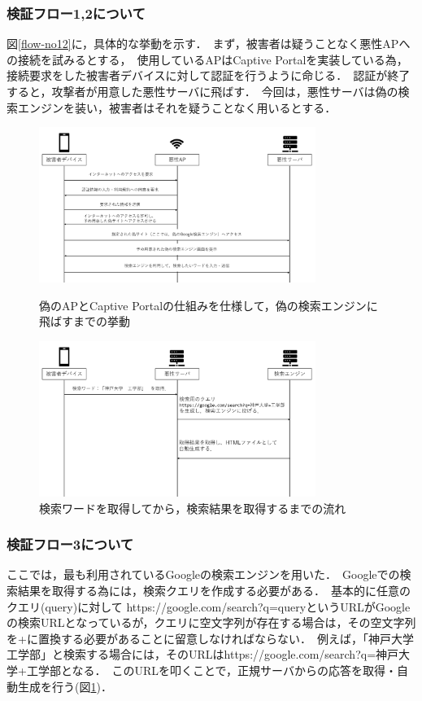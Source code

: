 \documentclass[dvipdfmx,twocolumn,9pt]{jsarticle}
\begin{document}
            \subsubsection{検証フロー1,2について}
                図\ref{flow-no12}に，具体的な挙動を示す．\
                まず，被害者は疑うことなく悪性APへの接続を試みるとする，\
                使用しているAPはCaptive Portalを実装している為，接続要求をした被害者デバイスに対して認証を行うように命じる．\
                認証が終了すると，攻撃者が用意した悪性サーバに飛ばす．\
                今回は，悪性サーバは偽の検索エンジンを装い，被害者はそれを疑うことなく用いるとする．\
                \begin{figure}[t]
                    \centering
                    \includegraphics[width=9cm]{img/vc-vf-1-2.png}
                    \caption{偽のAPとCaptive Portalの仕組みを仕様して，偽の検索エンジンに飛ばすまでの挙動}
                    \label{flow-no12}
                    \includegraphics[width=9cm]{img/vc-vf-3.png}
                    \caption{検索ワードを取得してから，検索結果を取得するまでの流れ}
                    \label{flow-no3} 
                \end{figure}
            \subsubsection{検証フロー3について}
                ここでは，最も利用されているGoogleの検索エンジンを用いた．\
                Googleでの検索結果を取得する為には，検索クエリを作成する必要がある．\
                基本的に任意のクエリ(query)に対して https://google.com/search?q=queryというURLがGoogleの検索URLとなっているが，クエリに空文字列が存在する場合は，その空文字列を+に置換する必要があることに留意しなければならない．\
                例えば，「神戸大学　工学部」と検索する場合には，そのURLはhttps://google.com/search?q=神戸大学+工学部となる．\
                このURLを叩くことで，正規サーバからの応答を取得・自動生成を行う(図\ref{flow-no3})．\\
\end{document}
